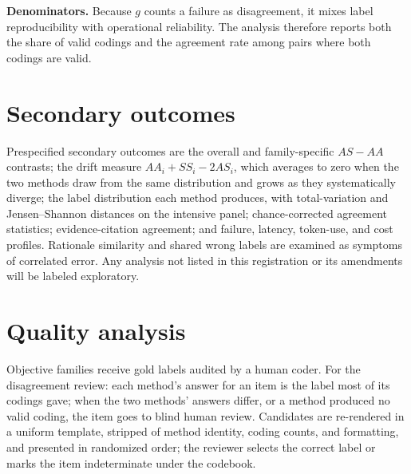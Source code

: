 \documentclass[12pt]{article}
\begin{document}
\textbf{Denominators.} Because $g$ counts a failure as disagreement, it mixes label reproducibility with operational reliability. The analysis therefore reports both the share of valid codings and the agreement rate among pairs where both codings are valid.

\section{Secondary outcomes}
\label{sec:secondary}

Prespecified secondary outcomes are the overall and family-specific $AS-AA$ contrasts; the drift measure $AA_i+SS_i-2AS_i$, which averages to zero when the two methods draw from the same distribution and grows as they systematically diverge; the label distribution each method produces, with total-variation and Jensen--Shannon distances on the intensive panel; chance-corrected agreement statistics; evidence-citation agreement; and failure, latency, token-use, and cost profiles. Rationale similarity and shared wrong labels are examined as symptoms of correlated error. Any analysis not listed in this registration or its amendments will be labeled exploratory.

\section{Quality analysis}

Objective families receive gold labels audited by a human coder. For the disagreement review: each method's answer for an item is the label most of its codings gave; when the two methods' answers differ, or a method produced no valid coding, the item goes to blind human review. Candidates are re-rendered in a uniform template, stripped of method identity, coding counts, and formatting, and presented in randomized order; the reviewer selects the correct label or marks the item indeterminate under the codebook.
\end{document}
